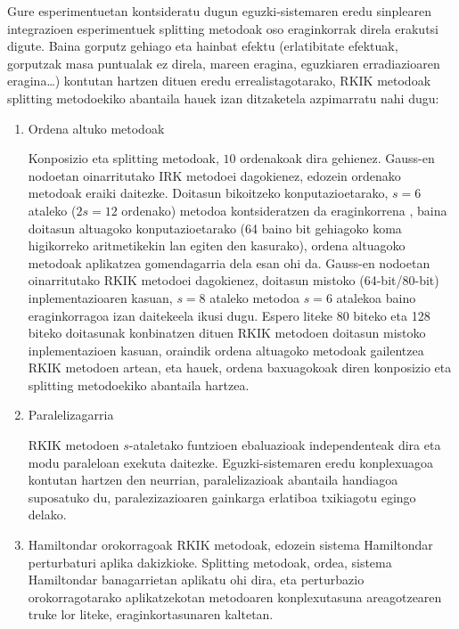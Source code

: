 
 Gure esperimentuetan kontsideratu dugun eguzki-sistemaren eredu sinplearen integrazioen  esperimentuek splitting metodoak oso eraginkorrak direla erakutsi digute. Baina gorputz gehiago eta hainbat efektu (erlatibitate efektuak, gorputzak masa puntualak ez direla, mareen eragina, eguzkiaren erradiazioaren eragina\dots) kontutan hartzen dituen eredu errealistagotarako, RKIK metodoak splitting metodoekiko abantaila hauek izan ditzaketela azpimarratu nahi dugu:

\begin{enumerate}

\item Ordena altuko metodoak

Konposizio eta  splitting metodoak, $10$ ordenakoak dira gehienez. Gauss-en nodoetan oinarritutako IRK metodoei dagokienez, edozein ordenako metodoak eraiki daitezke. Doitasun bikoitzeko konputazioetarako, $s=6$ ataleko ($2s=12$ ordenako) metodoa  kontsideratzen da eraginkorrena \cite{Hairer2008}, baina doitasun altuagoko konputazioetarako (64 baino bit gehiagoko koma higikorreko aritmetikekin lan egiten den kasurako), ordena altuagoko metodoak aplikatzea gomendagarria dela esan ohi  da. Gauss-en nodoetan oinarritutako RKIK metodoei dagokienez, doitasun mistoko (64-bit/80-bit)   inplementazioaren kasuan, $s=8$ ataleko metodoa $s=6$ atalekoa baino eraginkorragoa izan daitekeela ikusi dugu. Espero liteke 80 biteko eta 128 biteko doitasunak konbinatzen dituen RKIK metodoen doitasun mistoko inplementazioen kasuan, oraindik ordena altuagoko metodoak gailentzea RKIK metodoen artean, eta hauek, ordena baxuagokoak diren konposizio eta splitting metodoekiko abantaila hartzea.


\item Paralelizagarria

RKIK metodoen $s$-ataletako funtzioen ebaluazioak independenteak dira eta modu paraleloan exekuta daitezke. Eguzki-sistemaren eredu konplexuagoa kontutan hartzen den neurrian, paralelizazioak abantaila handiagoa suposatuko du, paralezizazioaren gainkarga erlatiboa txikiagotu egingo delako.

\item Hamiltondar orokorragoak
RKIK metodoak, edozein sistema Hamiltondar perturbaturi aplika dakizkioke. Splitting metodoak, ordea, sistema Hamiltondar banagarrietan aplikatu ohi dira, eta perturbazio orokorragotarako aplikatzekotan metodoaren konplexutasuna areagotzearen truke lor liteke, eraginkortasunaren kaltetan.



\end{enumerate}
